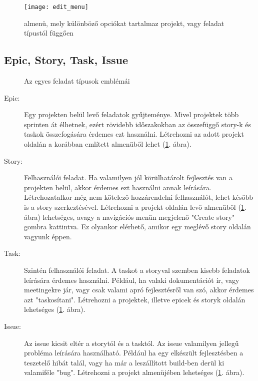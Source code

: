 \begin{figure}[H]
	\centering
	\texttt{[image: edit\_menu]}
	\caption{almenü, mely különböző opciókat tartalmaz projekt, vagy feladat típustól függően}
	\label{fig:example-4}
\end{figure}

\subsection{Epic, Story, Task, Issue}
\label{stories}

\begin{figure}[H]
	\centering
	\hspace{35pt}
	\hspace{35pt}
	\hspace{35pt}
	\caption{Az egyes feladat típusok emblémái}
	\label{fig:example-5}
\end{figure}


\begin{description}
	\item[Epic:] Egy projekten belül levő feladatok gyűjteménye. Mivel projektek több sprinten át élhetnek, ezért rövidebb időszakokban az összefüggő story-k és taskok összefogására érdemes ezt használni. Létrehozni az adott projekt oldalán a korábban említett almenüből lehet (\ref{fig:example-4}. ábra). 
	\item[Story:] Felhasználói feladat. Ha valamilyen jól körülhatárolt fejlesztés van a projekten belül, akkor érdemes ezt használni annak leírására. Létrehozatalkor még nem kötelező hozzárendelni felhasználót, lehet később is a story szerkeztésével. Létrehozni a projekt oldalán levő almenüből (\ref{fig:example-4}. ábra) lehetséges, avagy a navigációs menün megjelenő "Create story" gombra kattintva. Ez olyankor elérhető, amikor egy meglévő story oldalán vagyunk éppen.
	\item[Task:] Szintén felhasználói feladat. A taskot a storyval szemben kisebb feladatok leírására érdemes használni. Például, ha valaki dokumentációt ír, vagy meetingekre jár, vagy csak valami apró fejlesztésről van szó, akkor érdemes azt "taskosítani". Létrehozni a projektek, illetve epicek és storyk oldalán lehetséges (\ref{fig:example-4}. ábra). 
	\item[Issue:] Az issue kicsit eltér a storytól és a tasktól. Az issue valamilyen jellegű probléma leírására használható. Például ha egy elkészült fejlesztésben a teszetelő hibát talál, vagy ha már a leszállított build-ben derül ki valamiféle "bug". Létrehozni a projekt almenüjében lehetséges (\ref{fig:example-4}. ábra).
\end{description}

